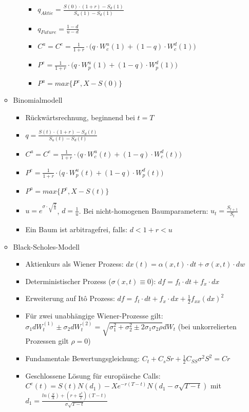 \begin{itemize}
\begin{itemize}
\begin{enumerate}
			\begin{itemize}
				\item \(q_{Aktie}=\frac{S(0)\cdot(1+r)-S_d(1)}{S_u(1)-S_d(1)}\)
				\item \(q_{Future}=\frac{1-d}{u-d}\)
				\item \(C^a=C^e=\frac{1}{1+r}\cdot\Big(q\cdot W_c^u(1)+(1-q)\cdot W_c^d(1)\Big)\)
				\item \(P^e=\frac{1}{1+r}\cdot\Big(q\cdot W_p^u(1)+(1-q)\cdot W_p^d(1)\Big)\)
				\item \(P^a=max\Big\{P^e,X-S(0)\Big\}\)
			\end{itemize}
		\end{enumerate}
		\item Binomialmodell
		\begin{itemize}
			\item Rückwärtsrechnung, beginnend bei \(t=T\)
			\item \(q=\frac{S(t)\cdot(1+r)-S_d(t)}{S_u(t)-S_d(t)}\)
			\item \(C^a=C^e=\frac{1}{1+r}\cdot\Big(q\cdot W_c^u(t)+(1-q)\cdot W_c^d(t)\Big)\)
			\item \(P^e=\frac{1}{1+r}\cdot\Big(q\cdot W_p^u(t)+(1-q)\cdot W_p^d(t)\Big)\)
			\item \(P^a=max\Big\{P^e,X-S(t)\Big\}\)
			\item \(u=e^{\sigma\cdot\sqrt{\frac{T}{n}}}\), \(d=\frac{1}{u}\). Bei nicht-homogenen Baumparametern: \(u_t=\frac{S_{t+1}}{S_t}\)
			\item Ein Baum ist arbitragefrei, falls: \(d<1+r<u\)
		\end{itemize}
		\item Black-Scholes-Modell
		\begin{itemize}
			\item Aktienkurs als Wiener Prozess: \(dx(t) = \alpha(x,t)\cdot dt + \sigma(x,t)\cdot dw\)
			\item Deterministischer Prozess (\(\sigma(x,t) \equiv 0\)): \(df=f_t\cdot dt + f_x\cdot dx\)
			\item Erweiterung auf Itô Prozess: \(df=f_t\cdot dt + f_x\cdot dx + \frac{1}{2} f_{xx}(dx)^2\)
			\item Für zwei unabhängige Wiener-Prozesse gilt: \(\sigma_1dW_t^{(1)} \pm \sigma_2dW_t^{(2)} = \sqrt{\sigma_1^2+\sigma_2^2 \pm 2\sigma_1\sigma_2\rho}dW_t\) (bei unkorrelierten Prozessen gilt \(\rho=0\))
			\item Fundamentale Bewertungsgleichung: \(C_t + C_sSr + \frac{1}{2}C_{SS}\sigma^2S^2 = Cr\)
			\item Geschlossene Lösung für europäische Calls: \(C^e(t) = S(t)N(d_1) - Xe^{-r(T-t)}N(d_1-\sigma\sqrt{T-t})\) mit \(d_1 = \frac{ln(\frac{S}{X})+(r+\frac{\sigma^2}{2})(T-t)}{\sigma\sqrt{T-t}}\)

\end{itemize}
\end{itemize}
\end{itemize}
